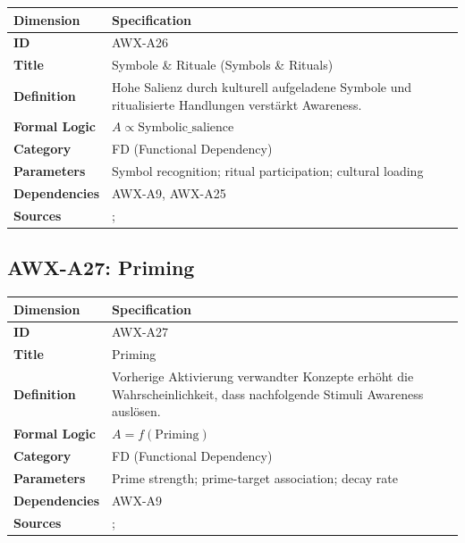 \begin{table}[htbp]
\small
\begin{tabular}{p{3cm}p{11cm}}
\toprule
\textbf{Dimension} & \textbf{Specification} \\
\midrule
\textbf{ID} & AWX-A26 \\
\textbf{Title} & Symbole \& Rituale (Symbols \& Rituals) \\
\textbf{Definition} & Hohe Salienz durch kulturell aufgeladene Symbole und ritualisierte Handlungen verstärkt Awareness. \\
\textbf{Formal Logic} & $A \propto \text{Symbolic\_salience}$ \\
\textbf{Category} & FD (Functional Dependency) \\
\textbf{Parameters} & Symbol recognition; ritual participation; cultural loading \\
\textbf{Dependencies} & AWX-A9, AWX-A25 \\
\textbf{Sources} & \citet{akerlof2000identity}; \citet{akerlof2010identity} \\
\bottomrule
\end{tabular}
\end{table}


\subsection{AWX-A27: Priming}

\begin{table}[htbp]
\small
\begin{tabular}{p{3cm}p{11cm}}
\toprule
\textbf{Dimension} & \textbf{Specification} \\
\midrule
\textbf{ID} & AWX-A27 \\
\textbf{Title} & Priming \\
\textbf{Definition} & Vorherige Aktivierung verwandter Konzepte erhöht die Wahrscheinlichkeit, dass nachfolgende Stimuli Awareness auslösen. \\
\textbf{Formal Logic} & $A = f(\text{Priming})$ \\
\textbf{Category} & FD (Functional Dependency) \\
\textbf{Parameters} & Prime strength; prime-target association; decay rate \\
\textbf{Dependencies} & AWX-A9 \\
\textbf{Sources} & \citet{bargh1996automaticity}; \citet{kahneman2003maps} \\
\bottomrule
\end{tabular}
\end{table}

